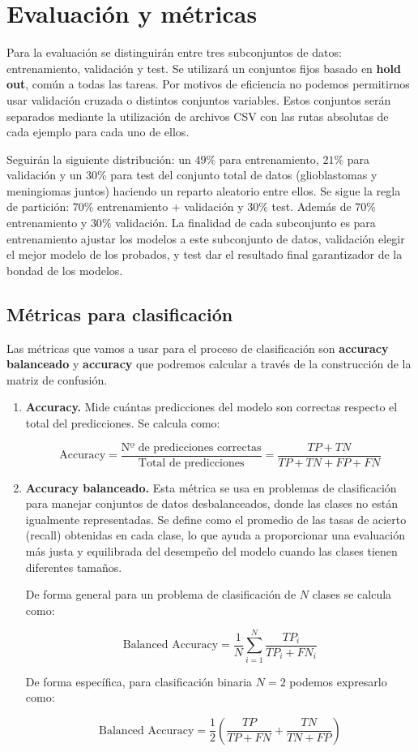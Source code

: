 \section{Evaluación y métricas}

Para la evaluación se distinguirán entre tres subconjuntos de datos: entrenamiento, validación y test. Se utilizará un conjuntos fijos basado en \textbf{hold out}, común a todas las tareas. Por motivos de eficiencia no podemos permitirnos usar validación cruzada o distintos conjuntos variables. Estos conjuntos serán separados mediante la utilización de archivos CSV con las rutas absolutas de cada ejemplo para cada uno de ellos. 

Seguirán la siguiente distribución: un $49 \%$ para entrenamiento, $21 \%$ para validación y un $30 \%$ para test del conjunto total de datos (glioblastomas y meningiomas juntos) haciendo un reparto aleatorio entre ellos. Se sigue la regla de partición: $70 \%$ entrenamiento + validación y $30 \%$ test. Además de $70 \%$ entrenamiento y $30 \%$ validación. La finalidad de cada subconjunto es para entrenamiento ajustar los modelos a este subconjunto de datos, validación elegir el mejor modelo de los probados, y test dar el resultado final garantizador de la bondad de los modelos.

\subsection{Métricas para clasificación}

Las métricas que vamos a usar para el proceso de clasificación son \textbf{accuracy balanceado} y \textbf{accuracy} que podremos calcular a través de la construcción de la matriz de confusión. 

\begin{enumerate}
	\item \textbf{Accuracy.} Mide cuántas predicciones del modelo son correctas respecto el total del predicciones. Se calcula como: 
	
	$$ \text{Accuracy} = \frac{\text{Nº de predicciones correctas}}{\text{Total de predicciones}} = \frac{TP + TN}{TP + TN + FP + FN}$$
	
	\item \textbf{Accuracy balanceado.} Esta métrica se usa en problemas de clasificación para manejar conjuntos de datos desbalanceados, donde las clases no están igualmente representadas. Se define como el promedio de las tasas de acierto (recall) obtenidas en cada clase, lo que ayuda a proporcionar una evaluación más justa y equilibrada del desempeño del modelo cuando las clases tienen diferentes tamaños.
	
	De forma general para un problema de clasificación de $N$ clases se calcula como:
	
	$$  \text{Balanced Accuracy} = \frac{1}{N} \sum_{i=1}^{N} \frac{TP_i}{TP_i + FN_i}$$
	
	De forma específica, para clasificación binaria $N = 2$ podemos expresarlo como:
	
	$$ \text{Balanced Accuracy} = \frac{1}{2} \left( \frac{TP}{TP + FN} + \frac{TN}{TN + FP} \right) $$ 
\end{enumerate}


